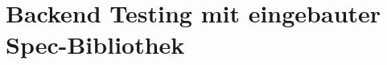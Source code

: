 \section{Backend Testing mit eingebauter Spec-Bibliothek}
\label{sec:t-backend-testing-mit-eingebauter-spec-bibliothek'}
